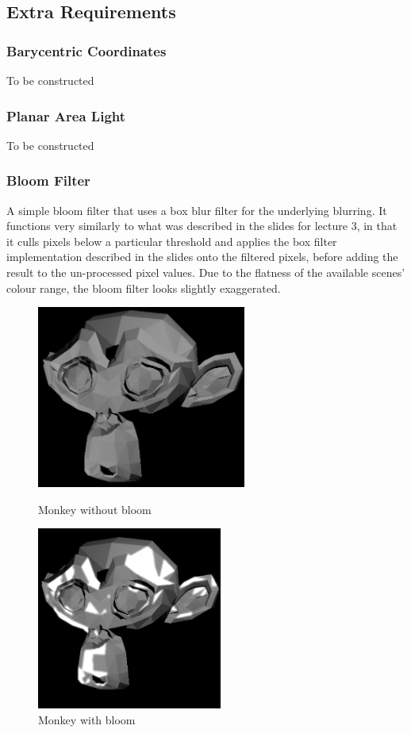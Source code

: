 \documentclass{article}
\begin{document}
    \subsection{Extra Requirements}
    \subsubsection{Barycentric Coordinates}
    To be constructed

    \subsubsection{Planar Area Light}
    To be constructed

    \subsubsection{Bloom Filter}
    A simple bloom filter that uses a box blur filter for the underlying blurring. It functions very similarly 
    to what was described in the slides for lecture 3, in that it culls pixels below a particular threshold 
    and applies the box filter implementation described in the slides onto the filtered pixels, before adding 
    the result to the un-processed pixel values. Due to the flatness of the available scenes' colour range,
    the bloom filter looks slightly exaggerated.

    \begin{figure}[!htb]
          \includegraphics[width=\linewidth, height=6cm]{images/monkey_no_bloom}
          \caption*{Monkey without bloom}
        \endminipage\hfill
          \includegraphics[width=\linewidth, height=6cm]{images/monkey_bloom}
          \caption*{Monkey with bloom}
        \endminipage
    \end{figure}
    
\end{document}
